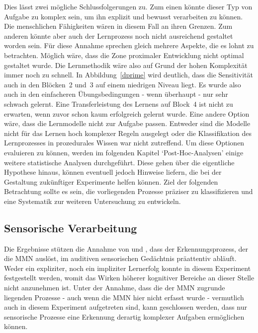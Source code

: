\documentclass[doc,a4paper,12pt]{apa6}
\begin{document}
Dies lässt zwei mögliche Schlussfolgerungen zu. Zum einen könnte dieser Typ von Aufgabe zu komplex sein, um ihn explizit und bewusst verarbeiten zu können. Die menschlichen Fähigkeiten wären in diesem Fall an ihren Grenzen. Zum anderen könnte aber auch der Lernprozess noch nicht ausreichend gestaltet worden sein. Für diese Annahme sprechen gleich mehrere Aspekte, die es lohnt zu betrachten. Möglich wäre, dass die Zone proximaler Entwicklung \parencite{kozulin2003vygotsky} nicht optimal gestaltet wurde. Die Lernmethodik wäre also auf Grund der hohen Komplexität immer noch zu schnell. In Abbildung~\ref{dprime} wird deutlich, dass die Sensitivität auch in den Blöcken~2 und~3 auf einem niedrigen Niveau liegt. Es wurde also auch in den einfacheren Übungsbedingungen - wenn überhaupt - nur sehr schwach gelernt. Eine Transferleistung des Lernens auf Block~4 ist nicht zu erwarten, wenn zuvor schon kaum erfolgreich gelernt wurde. Eine andere Option wäre, dass die Lernmodelle nicht zur Aufgabe passen. Entweder sind die Modelle nicht für das Lernen hoch komplexer Regeln ausgelegt oder die Klassifikation des Lernprozesses in prozedurales Wissen war nicht zutreffend. Um diese Optionen evaluieren zu können, werden im folgenden Kapitel `Post-Hoc-Analysen' einige weitere statistische Analysen durchgeführt. Diese gehen über die eigentliche Hypothese hinaus, können eventuell jedoch Hinweise liefern, die bei der Gestaltung zukünftiger Experimente helfen können. Ziel der folgenden Betrachtung sollte es sein, die vorliegenden Prozesse präziser zu klassifizieren und eine Systematik zur weiteren Untersuchung zu entwickeln.

\subsection{Sensorische Verarbeitung}

Die Ergebnisse stützen die Annahme von \textcite{paavilainen2007preattentive} und \textcite{bendixen2008rapid}, dass der Erkennungsprozess, der die MMN auslöst, im auditiven sensorischen Gedächtnis präattentiv abläuft. Weder ein expliziter, noch ein impliziter Lernerfolg konnte in diesem Experiment festgestellt werden, womit das Wirken höherer kognitiver Bereiche an dieser Stelle nicht anzunehmen ist. Unter der Annahme, dass die der MMN zugrunde liegenden Prozesse - auch wenn die MMN hier nicht erfasst wurde - vermutlich auch in diesem Experiment aufgetreten sind, kann geschlossen werden, dass nur sensorische Prozesse eine Erkennung derartig komplexer Aufgaben ermöglichen können.
\end{document}
